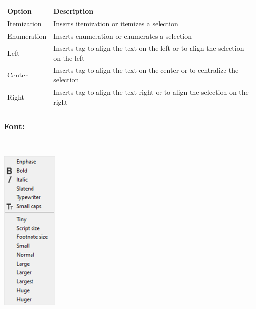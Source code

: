 \begin{scriptsize}
  \begin{tabularx}{\textwidth}{>{\hsize=0.2\hsize}X>{\hsize=0.8\hsize}X}\\
    \hline
    \textbf{Option} & \textbf{Description} \\
    \hline
    Itemization & Inserts itemization or itemizes a selection \\
    Enumeration & Inserts enumeration or enumerates a selection \\
    \hdashline[1pt/1pt]
    Left & Inserts tag to align the text on the left or to align the selection on the left \\
    Center & Inserts tag to align the text on the center or to centralize the selection \\
    Right & Inserts tag to align the text right or to align the selection on the right \\
    \hline
  \end{tabularx}
\end{scriptsize}


\newpage
\hypertarget{menu_insert_latex_font}{}
\subsubsection{Font:}\\

\includegraphics[scale=0.50]{./res/menu_insert_latex_font.png}\\


